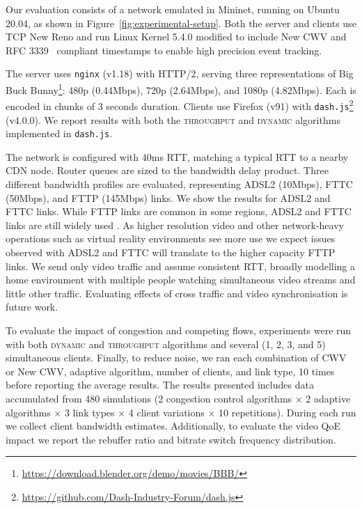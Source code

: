 \documentclass[10pt,sigconf]{acmart}
\begin{document}
Our evaluation consists of a network emulated in Mininet, running on Ubuntu 20.04, as shown in Figure~\ref{fig:experimental-setup}. Both the server and clients use TCP New Reno and run Linux Kernel 5.4.0 modified to include New CWV and RFC 3339~\cite{rfc3339-precise-timestamps} compliant timestamps to enable high precision event tracking. 

The server uses \texttt{nginx} (v1.18) with HTTP/2, serving three representations of Big Buck Bunny\footnote{\url{https://download.blender.org/demo/movies/BBB/}}: 480p (0.44Mbps), 720p (2.64Mbps), and 1080p (4.82Mbps). Each is encoded in chunks of 3 seconds duration.
Clients use Firefox (v91) with \texttt{dash.js}\footnote{\url{https://github.com/Dash-Industry-Forum/dash.js}} (v4.0.0). We
report results with both the \textsc{throughput} and \textsc{dynamic} \cite{Spiteri-2019-from-theory-to-practice-sabre} algorithms implemented in \texttt{dash.js}.

The network is configured with 40ms RTT, matching a typical RTT to a nearby CDN node. Router queues are sized to the bandwidth delay product. Three different bandwidth profiles are evaluated, representing ADSL2 (10Mbps), FTTC (50Mbps), and FTTP (145Mbps) links. We show the results for ADSL2 and FTTC links.
While FTTP links are common in some regions, ADSL2 and FTTC links are still widely used \cite{ofcom-2020-report,FCC-measuring-broadband-america,EC-measuring-broadband-europe,ACCC-measuring-broadband-australia}. As higher resolution video and other network-heavy operations such as virtual reality environments see more use we expect issues observed with ADSL2 and FTTC will translate to the higher capacity FTTP links.
We send only video traffic and assume consistent RTT, broadly modelling a home environment with multiple people watching simultaneous video streams and little other traffic. Evaluating effects of cross traffic and video synchronisation is future work.

To evaluate the impact of congestion and competing flows, experiments were run with both \textsc{dynamic} and \textsc{throughput} algorithms and several (1, 2, 3, and 5) simultaneous clients. Finally, to reduce noise, we ran each combination of CWV or New CWV, adaptive algorithm, number of clients, and link type, 10 times before reporting the average results. The results presented includes data accumulated from 480 simulations (2 congestion control algorithms $\times$ 2 adaptive algorithms $\times$ 3 link types $\times$ 4 client variations $\times$ 10 repetitions). 
During each run we collect client bandwidth estimates. Additionally, to evaluate the video QoE impact we report the rebuffer ratio and bitrate switch frequency distribution.
\end{document}
